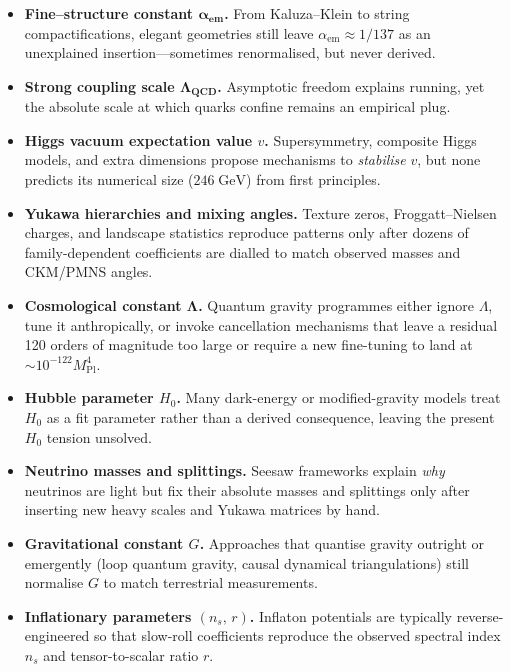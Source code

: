 \documentclass[11pt]{article}
\begin{document}
\begin{itemize}
  \item \textbf{Fine–structure constant \(\boldsymbol{\alpha_{\text{em}}}\).}  
        From Kaluza–Klein to string compactifications, elegant geometries still leave \(\alpha_{\text{em}}\approx1/137\) as an unexplained insertion—sometimes renormalised, but never derived.

  \item \textbf{Strong coupling scale \(\boldsymbol{\Lambda_{\text{QCD}}}\).}  
        Asymptotic freedom explains running, yet the absolute scale at which quarks confine remains an empirical plug.

  \item \textbf{Higgs vacuum expectation value \(v\).}  
        Supersymmetry, composite Higgs models, and extra dimensions propose mechanisms to \emph{stabilise} \(v\), but none predicts its numerical size (\(246\;\text{GeV}\)) from first principles.

  \item \textbf{Yukawa hierarchies and mixing angles.}  
        Texture zeros, Froggatt–Nielsen charges, and landscape statistics reproduce patterns only after dozens of family-dependent coefficients are dialled to match observed masses and CKM/PMNS angles.

  \item \textbf{Cosmological constant \(\boldsymbol{\Lambda}\).}  
        Quantum gravity programmes either ignore \(\Lambda\), tune it anthropically, or invoke cancellation mechanisms that leave a residual 120 orders of magnitude too large or require a new fine-tuning to land at \(\sim10^{-122}M_{\text{Pl}}^{4}\).

  \item \textbf{Hubble parameter \(H_{0}\).}  
        Many dark-energy or modified-gravity models treat \(H_{0}\) as a fit parameter rather than a derived consequence, leaving the present \(H_{0}\) tension unsolved.

  \item \textbf{Neutrino masses and splittings.}  
        Seesaw frameworks explain \emph{why} neutrinos are light but fix their absolute masses and splittings only after inserting new heavy scales and Yukawa matrices by hand.

  \item \textbf{Gravitational constant \(G\).}  
        Approaches that quantise gravity outright or emergently (loop quantum gravity, causal dynamical triangulations) still normalise \(G\) to match terrestrial measurements.

  \item \textbf{Inflationary parameters \((n_{s},\,r)\).}  
        Inflaton potentials are typically reverse-engineered so that slow-roll coefficients reproduce the observed spectral index \(n_{s}\) and tensor-to-scalar ratio \(r\).
\end{itemize}
\end{document}
